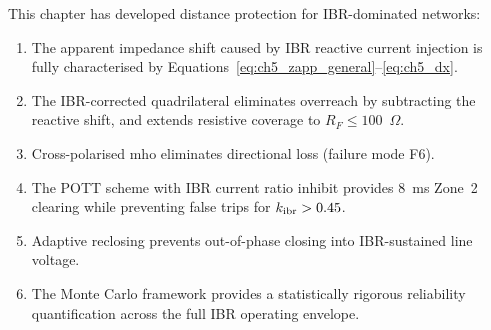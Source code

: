 This chapter has developed distance protection for IBR-dominated networks:
\begin{enumerate}
\item The apparent impedance shift caused by IBR reactive current injection
      is fully characterised by Equations~\eqref{eq:ch5_zapp_general}--\eqref{eq:ch5_dx}.
\item The IBR-corrected quadrilateral eliminates overreach by
      subtracting the reactive shift, and extends resistive coverage to
      $R_F \leq 100$~$\Omega$.
\item Cross-polarised mho eliminates directional loss (failure mode F6).
\item The POTT scheme with IBR current ratio inhibit provides 8~ms
      Zone~2 clearing while preventing false trips for $k_\mathrm{ibr} > 0.45$.
\item Adaptive reclosing prevents out-of-phase closing into IBR-sustained
      line voltage.
\item The Monte Carlo framework provides a statistically rigorous
      reliability quantification across the full IBR operating envelope.
\end{enumerate}
